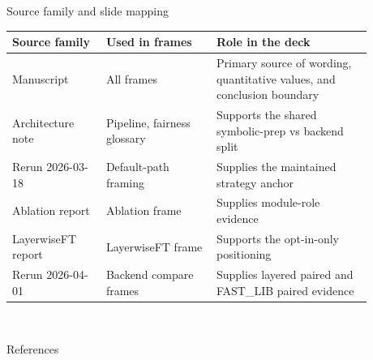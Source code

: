 \documentclass[aspectratio=169,10pt]{beamer}
\begin{document}
\appendix

\begin{frame}{Source family and slide mapping}
  \small
  \begin{tabular}{>{\raggedright\arraybackslash}p{0.23\linewidth} >{\raggedright\arraybackslash}p{0.27\linewidth} >{\raggedright\arraybackslash}p{0.38\linewidth}}
    \toprule
    \textbf{Source family} & \textbf{Used in frames} & \textbf{Role in the deck} \\
    \midrule
    Manuscript & All frames & Primary source of wording, quantitative values, and conclusion boundary \\
    Architecture note & Pipeline, fairness glossary & Supports the shared symbolic-prep vs backend split \\
    Rerun 2026-03-18 & Default-path framing & Supplies the maintained strategy anchor \\
    Ablation report & Ablation frame & Supplies module-role evidence \\
    LayerwiseFT report & LayerwiseFT frame & Supports the opt-in-only positioning \\
    Rerun 2026-04-01 & Backend compare frames & Supplies layered paired and FAST\_LIB paired evidence \\
    \bottomrule
  \end{tabular}
  \vspace{0.35cm}
  \\
\end{frame}

\begin{frame}[allowframebreaks]{References}
  \footnotesize
  
  
\end{frame}
\end{document}
